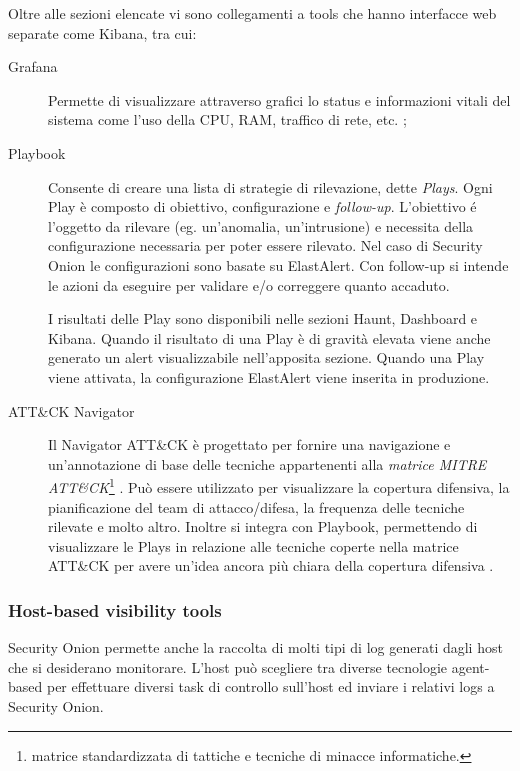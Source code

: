 Oltre alle sezioni elencate vi sono collegamenti a tools che hanno interfacce web separate come Kibana, tra cui:
\begin{description}
    \item [Grafana ]  Permette di visualizzare attraverso grafici lo status e informazioni vitali del sistema come l'uso della CPU, RAM, traffico di rete, etc. \cite{grafana};
    \item [Playbook] Consente di creare una lista di strategie di rilevazione, dette \textit{Plays}. Ogni Play è composto di obiettivo, configurazione e \textit{follow-up}. L'obiettivo é l'oggetto da rilevare (eg. un'anomalia, un'intrusione) e necessita della configurazione necessaria per poter essere rilevato. Nel caso di Security Onion le configurazioni sono basate su ElastAlert. Con follow-up si intende le azioni da eseguire per validare e/o correggere quanto accaduto. 

    I risultati delle Play sono disponibili nelle sezioni Haunt, Dashboard e Kibana. Quando il risultato di una Play è di gravità elevata viene anche generato un alert visualizzabile nell'apposita sezione.
    Quando una Play viene attivata, la configurazione ElastAlert viene inserita in produzione.
    \item [ATT\&CK Navigator ] Il Navigator ATT\&CK è progettato per fornire una navigazione e un'annotazione di base delle tecniche appartenenti alla \textit{matrice MITRE ATT\&CK}\footnote{matrice standardizzata di tattiche e tecniche di minacce informatiche.} \cite{att&ck}. Può essere utilizzato  per visualizzare la  copertura difensiva, la pianificazione del  team di attacco/difesa, la frequenza delle tecniche rilevate e molto altro.
    Inoltre si integra con Playbook, permettendo di visualizzare le Plays in relazione alle tecniche coperte nella matrice ATT\&CK per avere un'idea ancora più chiara della copertura difensiva \cite{att&ckNavigator}.
\end{description}

\subsubsection*{Host-based visibility tools}
Security Onion permette anche la raccolta di molti tipi di log generati dagli host che si desiderano monitorare. L'host può scegliere tra diverse tecnologie agent-based per effettuare diversi task di controllo sull'host ed inviare i relativi logs a Security Onion.


